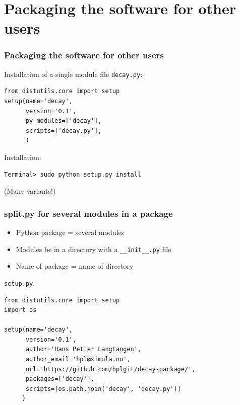 \documentclass{beamer}
\begin{document}
\section{Packaging the software for other users}

\begin{frame}
\frametitle{Packaging the software for other users}




Installation of a single module file \texttt{decay.py}:

\begin{verbatim}
from distutils.core import setup
setup(name='decay',
      version='0.1',
      py_modules=['decay'],
      scripts=['decay.py'],
      )
\end{verbatim}

Installation:

\begin{verbatim}
Terminal> sudo python setup.py install
\end{verbatim}

(Many variants!)


\end{frame}

\begin{frame}
\frametitle{split.py for several modules in a package}

\begin{itemize}
 \item Python package = several modules

 \item Modules be in a directory with a \Verb!__init__.py! file

 \item Name of package = name of directory
\end{itemize}

\noindent
\texttt{setup.py}:

\begin{verbatim}
from distutils.core import setup
import os

setup(name='decay',
      version='0.1',
      author='Hans Petter Langtangen',
      author_email='hpl@simula.no',
      url='https://github.com/hplgit/decay-package/',
      packages=['decay'],
      scripts=[os.path.join('decay', 'decay.py')]
     )
\end{verbatim}
\end{frame}
\end{document}
